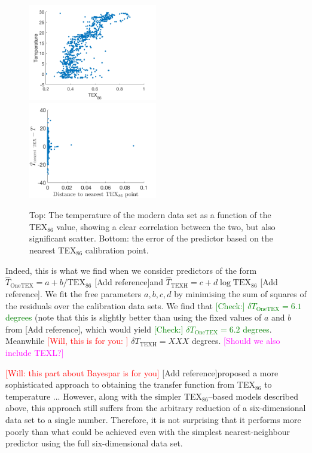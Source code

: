 \documentclass[rmp,aps,twocolumn]{revtex4-1}
\newcommand{\todo}[1]{\textcolor{red}{#1}}
\newcommand{\tocheck}[1]{\textcolor{green}{[Check:] #1}}
\newcommand{\citeme}{{\color{blue} [Add reference]}}
\newcommand{\ilya}[1]{\textcolor{magenta}{#1}}
\begin{document}
\begin{figure}
	\centering
	\includegraphics[width=0.5\textwidth]{TEX86.png}
	\includegraphics[width=0.5\textwidth]{TTEX86.png}
	\caption{\label{fig:TEX86}  Top: The temperature of the modern data set as a function of the TEX$_{86}$ value, showing a clear correlation between the two, but also significant scatter.  Bottom: the error of the predictor based on the nearest TEX$_{86}$ calibration point.}
\end{figure}

Indeed, this is what we find when we consider predictors of the form $\hat{T}_\mathrm{OneTEX}  = a + b / \mathrm{TEX}_{86}$ \citeme and $\hat{T}_\mathrm{TEXH}  = c + d \log \mathrm{TEX}_{86}$ \citeme.  We fit the free parameters $a, b, c, d$ by minimising the sum of squares of the residuals over the calibration data sets.  We find that \tocheck{$\delta T_\mathrm{OneTEX} = 6.1$ degrees} (note that this is slightly better than using the fixed values of $a$ and $b$ from \citeme, which would yield \tocheck{$\delta T_\mathrm{OneTEX} = 6.2$ degrees}.  Meanwhile \todo{[Will, this is for you: ]} $\delta T_\mathrm{TEXH} = XXX$ degrees.  \ilya{[Should we also include TEXL?]}  

\todo{[Will: this part about Bayespar is for you]} \citeme proposed a more sophisticated approach to obtaining the transfer function from TEX$_{86}$ to temperature ...  However, along with the simpler TEX$_{86}$--based models described above, this approach still suffers from the arbitrary reduction of a six-dimensional data set to a single number.  Therefore, it is not surprising that it performs more poorly than what could be achieved even with the simplest nearest-neighbour predictor using the full six-dimensional data set.
\end{document}
